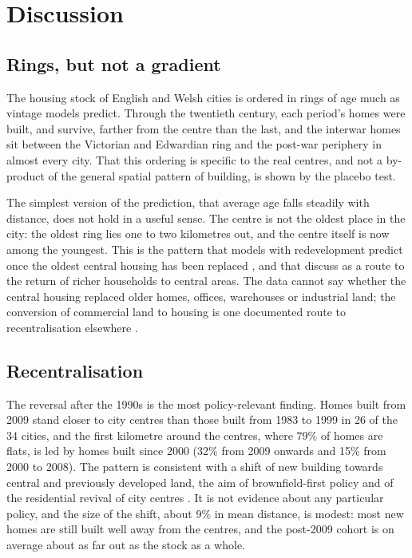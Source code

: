 \documentclass[11pt,a4paper]{article}
\begin{document}
\section{Discussion}
\label{sec:discussion}
\subsection{Rings, but not a gradient}
The housing stock of English and Welsh cities is ordered in rings of age much as vintage models predict. Through the twentieth century, each period's homes were built, and survive, farther from the centre than the last, and the interwar homes sit between the Victorian and Edwardian ring and the post-war periphery in almost every city. That this ordering is specific to the real centres, and not a by-product of the general spatial pattern of building, is shown by the placebo test.

The simplest version of the prediction, that average age falls steadily with distance, does not hold in a useful sense. The centre is not the oldest place in the city: the oldest ring lies one to two kilometres out, and the centre itself is now among the youngest. This is the pattern that models with redevelopment predict once the oldest central housing has been replaced \citep{wheaton1982,braid2001}, and that \citet{brueckner2009} discuss as a route to the return of richer households to central areas. The data cannot say whether the central housing replaced older homes, offices, warehouses or industrial land; the conversion of commercial land to housing is one documented route to recentralisation elsewhere \citep{xu2023}.

\subsection{Recentralisation}
The reversal after the 1990s is the most policy-relevant finding. Homes built from 2009 stand closer to city centres than those built from 1983 to 1999 in 26 of the 34 cities, and the first kilometre around the centres, where 79\% of homes are flats, is led by homes built since 2000 (32\% from 2009 onwards and 15\% from 2000 to 2008). The pattern is consistent with a shift of new building towards central and previously developed land, the aim of brownfield-first policy \citep{wong2010} and of the residential revival of city centres \citep{bromley2005}. It is not evidence about any particular policy, and the size of the shift, about 9\% in mean distance, is modest: most new homes are still built well away from the centres, and the post-2009 cohort is on average about as far out as the stock as a whole.
\end{document}
